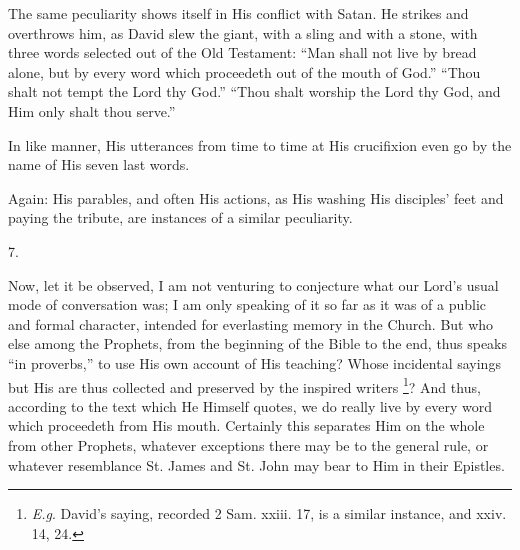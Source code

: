 The same peculiarity shows itself in His conflict with Satan. He
strikes and overthrows him, as David slew the giant, with a sling and
with a stone, with three words selected out of the Old Testament:
``Man shall not live by bread alone, but by every word which
proceedeth out of the mouth of God.'' ``Thou shalt not tempt
the Lord thy God.'' ``Thou shalt worship the Lord thy God, and
Him only shalt thou serve.''

In like manner, His utterances from time to time at His crucifixion
even go by the name of His seven last words.

Again: His parables, and often His actions, as His washing His
disciples' feet and paying the tribute, are instances of a similar
peculiarity.

7.

Now, let it be observed, I am not venturing to conjecture what our
Lord's usual mode of conversation was; I am only speaking of it so far
as it was of a public and formal character, intended for everlasting
memory in the Church. But who else among the Prophets, from the
beginning of the Bible to the end, thus speaks ``in
proverbs,'' to use His own account of His teaching? Whose
incidental sayings but His are thus collected and preserved by the
inspired writers \footnote{\emph{E.g}. David's saying, recorded 2 Sam.
xxiii. 17, is a similar instance, and xxiv. 14, 24.}? And
thus, according to the text which He Himself quotes, we do
really live by every word which proceedeth from His mouth. Certainly
this separates Him on the whole from other Prophets, whatever
exceptions there may be to the general rule, or whatever resemblance
St. James and St. John may bear to Him in their Epistles.

